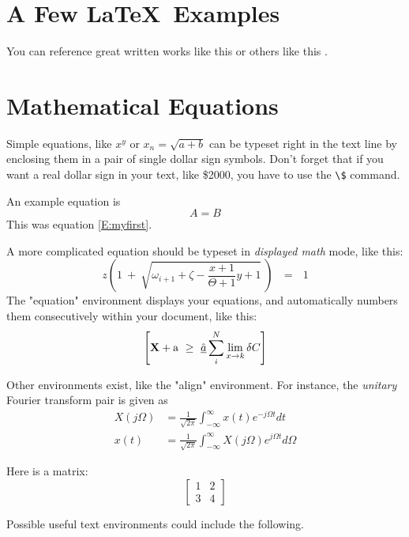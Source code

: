 \documentclass[12pt,draft]{report}
\begin{document}
\section{A Few \LaTeX\ Examples}

You can reference great written works like this \cite{ABC} or
others like this \cite{XYZ}.


\section {Mathematical Equations}
Simple equations, like $x^y$ or $x_n = \sqrt{a + b}$ can be typeset right
in the text line by enclosing them in a pair of single dollar sign symbols.
Don't forget that if you want a real dollar sign in your text, like \$2000,
you have to use the \verb+\$+ command.

An example equation is
\begin{equation} \label{E:myfirst}
A = B
\end{equation}
This was equation \eqref{E:myfirst}.

A more complicated equation should be typeset in {\em displayed math\/} mode,
like this:
\[
z \left( 1 \ +\ \sqrt{\omega_{i+1} + \zeta -\frac{x+1}{\Theta +1} y + 1} 
\ \right)
\ \ \ =\ \ \ 1
\]
The "equation" environment displays your equations, and automatically
numbers them consecutively within your document, like this:
\begin{equation}
\left[
{\bf X} + {\rm a} \ \geq\ 
\underline{\hat a} \sum_i^N \lim_{x \rightarrow k} \delta C
\right]
\end{equation}


Other environments exist, like the "align" environment.  For instance,
the {\em unitary} Fourier transform pair is given as
\begin{align}
X(j\Omega) &= \frac{1}{\sqrt{2\pi}} \int_{-\infty}^{\infty} x(t) e^{-j\Omega t} dt\\
x(t) &= \frac{1}{\sqrt{2\pi}} \int_{-\infty}^{\infty} X(j\Omega) e^{j\Omega t} d\Omega
\end{align}

Here is a matrix:
$$
\left[ \begin{matrix} 1 & 2 \\ 3 & 4 \end{matrix} \right]
$$


Possible useful text environments could include the following.
\end{document}
